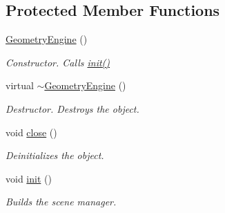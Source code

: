 \subsection*{Protected Member Functions}
\begin{DoxyCompactItemize}
\item 
\mbox{\label{class_geometry_engine_1_1_geometry_engine_a4afeab20b0589de673e1a054eb697b33}} 
\mbox{\hyperlink{class_geometry_engine_1_1_geometry_engine_a4afeab20b0589de673e1a054eb697b33}{Geometry\+Engine}} ()
\begin{DoxyCompactList}\small\item\em Constructor. Calls \mbox{\hyperlink{class_geometry_engine_1_1_geometry_engine_ac88f257e206bc135b7eb1e14c4497809}{init()}} \end{DoxyCompactList}\item 
\mbox{\label{class_geometry_engine_1_1_geometry_engine_ac1a101b4d29b8577f2c4da65181e517e}} 
virtual \mbox{\hyperlink{class_geometry_engine_1_1_geometry_engine_ac1a101b4d29b8577f2c4da65181e517e}{$\sim$\+Geometry\+Engine}} ()
\begin{DoxyCompactList}\small\item\em Destructor. Destroys the object. \end{DoxyCompactList}\item 
\mbox{\label{class_geometry_engine_1_1_geometry_engine_ad91cb15665b5ee4f82c407d2e240a266}} 
void \mbox{\hyperlink{class_geometry_engine_1_1_geometry_engine_ad91cb15665b5ee4f82c407d2e240a266}{close}} ()
\begin{DoxyCompactList}\small\item\em Deinitializes the object. \end{DoxyCompactList}\item 
\mbox{\label{class_geometry_engine_1_1_geometry_engine_ac88f257e206bc135b7eb1e14c4497809}} 
void \mbox{\hyperlink{class_geometry_engine_1_1_geometry_engine_ac88f257e206bc135b7eb1e14c4497809}{init}} ()
\begin{DoxyCompactList}\small\item\em Builds the scene manager. \end{DoxyCompactList}\end{DoxyCompactItemize}
